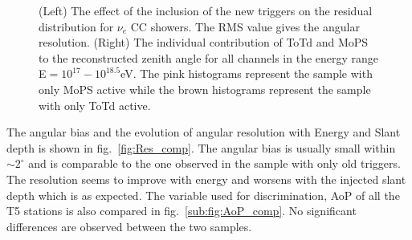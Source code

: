  

\begin{figure}[h!]
  \centering
  \hfill
  \caption{(Left) The effect of the inclusion of the new triggers on the residual distribution for $\nu_e$ CC showers. The RMS value gives the angular resolution. (Right) The individual contribution of ToTd and MoPS to the reconstructed zenith angle for all channels in the energy range E$=10^{17}-10^{18.5}$eV. The pink histograms represent the sample with only MoPS active while the brown histograms represent the sample with only ToTd active.}
  \label{fig:Res_Theta}
\end{figure}

The angular bias and the evolution of angular resolution with Energy and Slant depth is shown in fig.~\ref{fig:Res_comp}. The angular bias is usually small within $\sim 2^{\circ}$ and is comparable to the one observed in the sample with only old triggers. The resolution seems to improve with energy and worsens with the injected slant depth which is as expected. The variable used for discrimination, AoP of all the T5 stations is also compared in fig.~\ref{sub:fig:AoP_comp}. No significant differences are observed between the two samples. 

